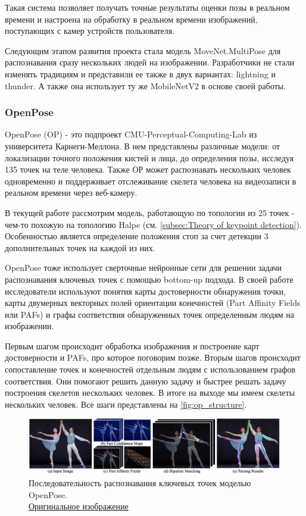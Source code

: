 Такая система позволяет получать точные результаты оценки позы в реальном времени и настроена на обработку в реальном времени изображений, поступающих с камер устройств пользователя.

Следующим этапом развития проекта стала модель MoveNet.MultiPose для распознавания сразу нескольких людей на изображении. Разработчики не стали изменять традициям и представили ее также в двух вариантах: lightning и thunder. А также она использует ту же MobileNetV2 в основе своей работы.



\subsubsection{OpenPose}

OpenPose (OP) - это подпроект CMU-Perceptual-Computing-Lab из университета Карнеги-Меллона. В нем представлены различные модели: от локализации точного положения кистей и лица, до определения позы, исследуя 135 точек на теле человека. Также ОР может распознавать нескольких человек одновременно и поддерживает отслеживание скелета человека на видеозаписи в реальном времени через веб-камеру.

В текущей работе рассмотрим модель, работающую по топологии из 25 точек - чем-то похожую на топологию Halpe (см. \autoref{subsec:Theory of keypoint detection}). Особенностью является определение положения стоп за счет детекции 3 дополнительных точек на каждой из них.

OpenPose тоже использует сверточные нейронные сети для решении задачи распознавания ключевых точек с помощью bottom-up подхода. В своей работе исследователи используют понятия карты достоверности обнаружения точки, карты двумерных векторных полей ориентации конечностей (Part Affinity Fields или PAFs) и графы соответствия обнаруженных точек определенным людям на изображении.

Первым шагом происходит обработка изображения и построение карт достоверности и PAFs, про которое поговорим позже. Вторым шагов происходит сопоставление точек и конечностей отдельным людям с использованием графов соответствия. Они помогают решить данную задачу и быстрее решать задачу построения скелетов нескольких человек. В итоге на выходе мы имеем скелеты нескольких человек. Все шаги представлены на \autoref{fig:op_structure}.

\begin{figure}[h]
	\centering
	\includegraphics[width=\textwidth]{./images/OpenPose/structure}
	\caption{Последовательность распознавания ключевых точек моделью OpenPose.\\ \href{https://miro.medium.com/0*rXablSR1mU2Mn-cG.png}{Оригинальное изображение}}
	\label{fig:op_structure}
\end{figure}

